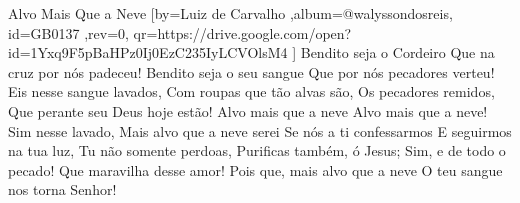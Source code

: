 \beginsong
{Alvo Mais Que a Neve %
}[by={Luiz de Carvalho %
},album={@walyssondosreis},
id={GB0137 %
},rev={0}, %
qr={https://drive.google.com/open?id=1Yxq9F5pBaHPz0Ij0EzC235IyLCVOlsM4 %
}]
\beginverse*
Bendito seja o Cordeiro
Que na cruz por nós padeceu!
Bendito seja o seu sangue
Que por nós pecadores verteu!
Eis nesse sangue lavados,
Com roupas que tão alvas são,
Os pecadores remidos,
Que perante seu Deus hoje estão!
\endverse
\beginchorus
Alvo mais que a neve
Alvo mais que a neve!
Sim nesse lavado,
Mais alvo que a neve serei
\endchorus
\beginverse*
Se nós a ti confessarmos
E seguirmos na tua luz,
Tu não somente perdoas,
Purificas também, ó Jesus;
Sim, e de todo o pecado!
Que maravilha desse amor!
Pois que, mais alvo que a neve
O teu sangue nos torna Senhor!
\endverse
\vspace{4em} %
\begin{comment}
\lstset{basicstyle=\scriptsize\bf} %
\tab{Solo 1}
\begin{lstlisting}
E|-----------------------------------------------------|
B|-----------------------------------------------------|
G|-----------------------------------------------------|
D|-----------------------------------------------------|
A|-----------------------------------------------------|
E|-----------------------------------------------------|
\end{lstlisting}
\end{comment}
 

